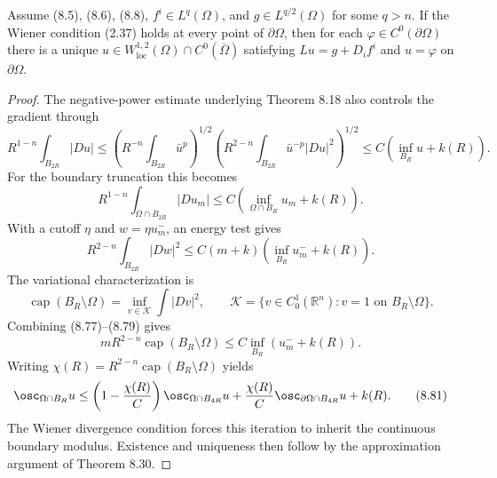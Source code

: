 \begin{theorem}
\label{gt-thm-8-31-continuous-dirichlet-wiener}
Assume (8.5), (8.6), (8.8), $f^i\in L^q(\Omega)$, and
$g\in L^{q/2}(\Omega)$ for some $q>n$. If the Wiener condition (2.37) holds at
every point of $\partial\Omega$, then for each $\varphi\in C^0(\partial\Omega)$
there is a unique
$u\in W^{1,2}_{\mathrm{loc}}(\Omega)\cap C^0(\overline\Omega)$ satisfying
$Lu=g+D_if^i$ and $u=\varphi$ on $\partial\Omega$.
\end{theorem}
\begin{proof}
\sketch The negative-power estimate underlying Theorem 8.18 also controls
the gradient through
\begin{equation}
\tag{8.76}
R^{1-n}\int_{B_{2R}}|Du|
\leq\left(R^{-n}\int_{B_{2R}}\bar u^p\right)^{1/2}
\left(R^{2-n}\int_{B_{2R}}\bar u^{-p}|Du|^2\right)^{1/2}
\leq C(\inf_{B_R}u+k(R)).
\end{equation}
For the boundary truncation this becomes
\begin{equation}
\tag{8.77}
R^{1-n}\int_{\Omega\cap B_{2R}}|Du_m|
\leq C(\inf_{\Omega\cap B_R}u_m+k(R)).
\end{equation}
With a cutoff $\eta$ and $w=\eta u_m^-$, an energy test gives
\begin{equation}
\tag{8.78}
R^{2-n}\int_{B_{2R}}|Dw|^2
\leq C(m+k)(\inf_{B_R}u_m^-+k(R)).
\end{equation}
The variational characterization is
\begin{equation}
\tag{8.79}
\operatorname{cap}(B_R\setminus\Omega)
=\inf_{v\in\mathcal K}\int|Dv|^2,
\qquad
\mathcal K=\{v\in C_0^1(\mathbb R^n):v=1\text{ on }B_R\setminus\Omega\}.
\end{equation}
Combining (8.77)--(8.79) gives
\begin{equation}
mR^{2-n}\operatorname{cap}(B_R\setminus\Omega)
\leq C\inf_{B_R}(u_m^-+k(R)).
\tag{8.80}
\end{equation}
Writing $\chi(R)=R^{2-n}\operatorname{cap}(B_R\setminus\Omega)$ yields
\begin{equation}
\osc_{\Omega\cap B_R}u
\leq\left(1-\frac{\chi(R)}C\right)\osc_{\Omega\cap B_{4R}}u
+\frac{\chi(R)}C\osc_{\partial\Omega\cap B_{4R}}u+k(R).
\tag{8.81}
\end{equation}
The Wiener divergence condition forces this iteration to inherit the continuous
boundary modulus. Existence and uniqueness then follow by the approximation
argument of Theorem 8.30.
\end{proof}

